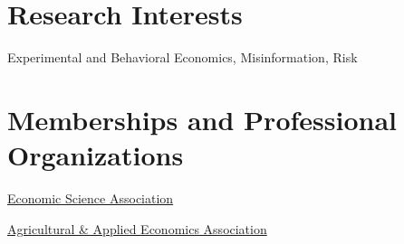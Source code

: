 \documentclass[10.5pt,a4paper]{moderncv}
\begin{document}
\makecvtitle



\section{Research Interests}
Experimental and Behavioral Economics, Misinformation, Risk











\section{Memberships and Professional Organizations}

{\href{https://www.economicscience.org/}{Economic Science Association}}
{}
{}
{}{}

{\href{https://www.aaea.org/}{Agricultural \& Applied Economics Association}}
{}
{}
{}{}









\end{document}
